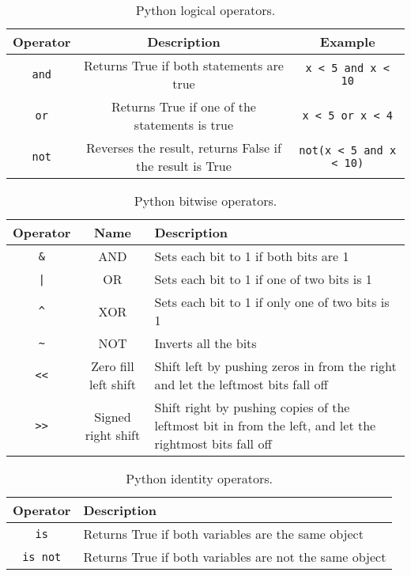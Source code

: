 \begin{table}[h!]
\centering
\renewcommand{\arraystretch}{1.3}
\begin{tabular}{|c|c|c|}
\hline
\textbf{Operator} & \textbf{Description} & \textbf{Example} \\
\hline
\texttt{and} & Returns True if both statements are true & \texttt{x < 5 and x < 10} \\
\texttt{or}  & Returns True if one of the statements is true & \texttt{x < 5 or x < 4} \\
\texttt{not} & Reverses the result, returns False if the result is True & \texttt{not(x < 5 and x < 10)} \\
\hline
\end{tabular}
\caption{Python logical operators.}
\end{table}

\begin{table}[h!]
\centering
\renewcommand{\arraystretch}{1.3}
\begin{tabular}{|c|c|p{8cm}|}
\hline
\textbf{Operator} & \textbf{Name} & \textbf{Description} \\
\hline
\texttt{\&}  & AND  & Sets each bit to 1 if both bits are 1 \\
\texttt{|}   & OR   & Sets each bit to 1 if one of two bits is 1 \\
\texttt{\^}  & XOR  & Sets each bit to 1 if only one of two bits is 1 \\
\texttt{\~}  & NOT  & Inverts all the bits \\
\texttt{<<}  & Zero fill left shift  & Shift left by pushing zeros in from the right and let the leftmost bits fall off \\
\texttt{>>}  & Signed right shift   & Shift right by pushing copies of the leftmost bit in from the left, and let the rightmost bits fall off \\
\hline
\end{tabular}
\caption{Python bitwise operators.}
\end{table}

\begin{table}[H]
\centering
\renewcommand{\arraystretch}{1.3}
\begin{tabular}{|c|p{10cm}|}
\hline
\textbf{Operator} & \textbf{Description} \\
\hline
\texttt{is}     & Returns True if both variables are the same object \\
\texttt{is not} & Returns True if both variables are not the same object \\
\hline
\end{tabular}
\caption{Python identity operators.}
\end{table}

